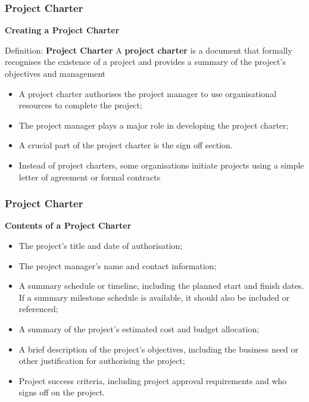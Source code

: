 \documentclass[aspectratio=169]{beamer}
\begin{document}
\begin{frame}
\frametitle{Project Charter}
\textbf{Creating a Project Charter}
\vspace{0.25cm}
\begin{block}{Definition: \textbf{Project Charter}}
A \textbf{project charter} is a document that formally recognises the existence of a project and provides a summary of the project's objectives and management
\end{block}
\vspace{0.25cm}
\begin{itemize}
\item A project charter authorises the project manager to use organisational resources to complete the project;
\item The project manager plays a major role in developing the project charter;
\item A crucial part of the project charter is the sign off section.
\item Instead of project charters, some organisations initiate projects using a simple letter of agreement or formal contracts
\end{itemize}
\end{frame}

\begin{frame}
\frametitle{Project Charter}
\textbf{Contents of a Project Charter}
\vspace{0.5cm}
\begin{itemize}
\item The project's title and date of authorisation;
\item The project manager's name and contact information;
\item A summary schedule or timeline, including the planned start and finish dates. If a summary milestone schedule is available, it should also be included or referenced;
\item A summary of the project's estimated cost and budget allocation;
\item A brief description of the project's objectives, including the business need or other justification for authorising the project;
\item Project success criteria, including project approval requirements and who signs off on the project.
\end{itemize}
\end{frame}
\end{document}
